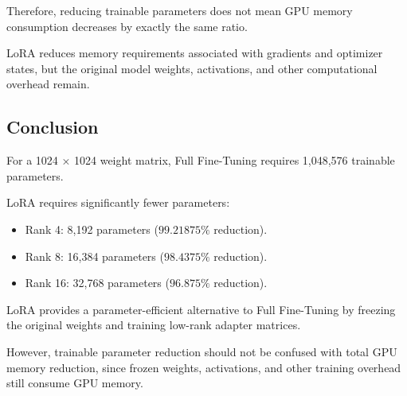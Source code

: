 Therefore, reducing trainable parameters does not mean GPU memory consumption decreases by exactly the same ratio.

LoRA reduces memory requirements associated with gradients and optimizer states, but the original model weights, activations, and other computational overhead remain.

\subsection{Conclusion}

For a 1024 × 1024 weight matrix, Full Fine-Tuning requires 1,048,576 trainable parameters.

LoRA requires significantly fewer parameters:

\begin{itemize}
\item Rank 4: 8,192 parameters ($99.21875\%$ reduction).
\item Rank 8: 16,384 parameters ($98.4375\%$ reduction).
\item Rank 16: 32,768 parameters ($96.875\%$ reduction).
\end{itemize}

LoRA provides a parameter-efficient alternative to Full Fine-Tuning by freezing the original weights and training low-rank adapter matrices.

However, trainable parameter reduction should not be confused with total GPU memory reduction, since frozen weights, activations, and other training overhead still consume GPU memory.
